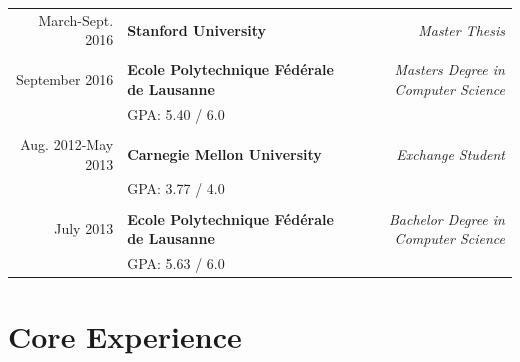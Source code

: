 \documentclass[a4paper,11pt]{article} %
\begin{document}
\begin{tabularx}{\textwidth}{r X r} 	

March-Sept. 2016 & 
\textbf{Stanford University} &
\textit{Master Thesis}\\
\\

September 2016 & 
\textbf{Ecole Polytechnique Fédérale de Lausanne} & 
\textit{Masters Degree in Computer Science}\\
&\footnotesize \textsc{GPA}: 5.40 / 6.0\\
\\

Aug. 2012-May 2013 & 
\textbf{Carnegie Mellon University} &
\textit{Exchange Student}\\
&\footnotesize \textsc{GPA}: 3.77 / 4.0\\
\\

July 2013 & 
\textbf{Ecole Polytechnique Fédérale de Lausanne} & 
\textit{Bachelor Degree in Computer Science}\\
&\footnotesize \textsc{GPA}: 5.63 / 6.0\\


\end{tabularx}


\section{Core Experience}
\end{document}

